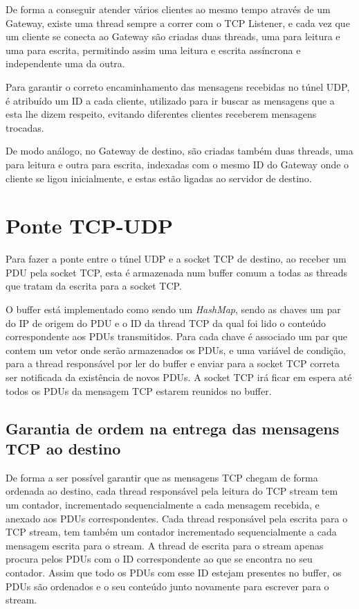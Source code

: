 \documentclass[a4paper]{report}
\begin{document}
De forma a conseguir atender vários clientes ao mesmo tempo através de um
Gateway, existe uma thread sempre a correr com o TCP Listener, e cada vez que um
cliente se conecta ao Gateway são criadas duas threads, uma para leitura e uma
para escrita, permitindo assim uma leitura e escrita assíncrona e independente
uma da outra. 

Para garantir o correto encaminhamento das mensagens recebidas no 
túnel UDP, é atribuído um ID a cada cliente, utilizado para ir buscar
as mensagens que a esta lhe dizem respeito, evitando diferentes clientes
receberem mensagens trocadas.

De modo análogo, no Gateway de destino, são criadas também duas threads,
uma para leitura e outra para escrita, indexadas com o mesmo ID do Gateway 
onde o cliente se ligou inicialmente, e estas estão ligadas ao servidor 
de destino.

\section{Ponte TCP-UDP} \label{sec:tcp}

Para fazer a ponte entre o túnel UDP e a socket TCP de destino, ao receber
um PDU pela socket TCP, esta é armazenada num buffer comum a todas as threads
que tratam da escrita para a socket TCP.

O buffer está implementado como sendo um \textit{HashMap}, sendo as chaves um 
par do IP de origem do PDU e o ID da thread TCP da qual foi lido o conteúdo 
correspondente aos PDUs transmitidos. Para cada chave é associado um par que
contem um vetor onde serão armazenados os PDUs, e uma variável de condição,
para a thread responsável por ler do buffer e enviar para a socket TCP correta
ser notificada da existência de novos PDUs. A socket TCP irá ficar em espera
até todos os PDUs da mensagem TCP estarem reunidos no buffer.

\subsection{Garantia de ordem na entrega das mensagens TCP ao destino}

De forma a ser possível garantir que as mensagens TCP chegam de forma ordenada
ao destino, cada thread responsável pela leitura do TCP stream tem um contador,
incrementado sequencialmente a cada mensagem recebida, e anexado aos PDUs
correspondentes. Cada thread responsável pela escrita para o TCP stream, tem
também um contador incrementado sequencialmente a cada mensagem escrita para o
stream. A thread de escrita para o stream apenas procura pelos PDUs com o ID
correspondente ao que se encontra no seu contador. Assim que todo os PDUs com 
esse ID estejam presentes no buffer, os PDUs são ordenados e o seu conteúdo
junto novamente para escrever para o stream.
\end{document}
